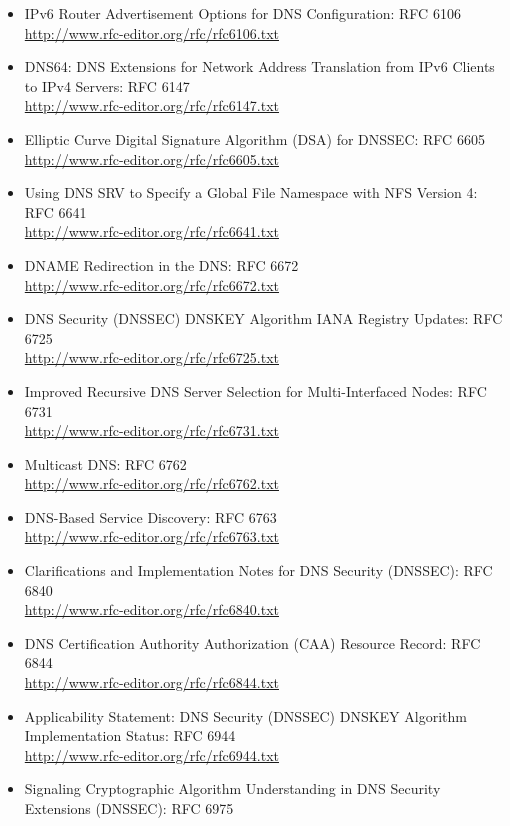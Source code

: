\begin{itemize}
\begin{itemize}
\begin{itemize}
\item IPv6 Router Advertisement Options for DNS Configuration: RFC 6106\\
\url{http://www.rfc-editor.org/rfc/rfc6106.txt}
\item DNS64: DNS Extensions for Network Address Translation from IPv6 
Clients to IPv4 Servers: RFC 6147\\
\url{http://www.rfc-editor.org/rfc/rfc6147.txt}
\item Elliptic Curve Digital Signature Algorithm (DSA) for DNSSEC: 
RFC 6605\\
\url{http://www.rfc-editor.org/rfc/rfc6605.txt}
\item Using DNS SRV to Specify a Global File Namespace with NFS 
Version 4: RFC 6641\\
\url{http://www.rfc-editor.org/rfc/rfc6641.txt}
\item DNAME Redirection in the DNS: RFC 6672\\
\url{http://www.rfc-editor.org/rfc/rfc6672.txt}
\item DNS Security (DNSSEC) DNSKEY Algorithm IANA Registry Updates: 
RFC 6725\\
\url{http://www.rfc-editor.org/rfc/rfc6725.txt}
\item Improved Recursive DNS Server Selection for Multi-Interfaced Nodes: 
RFC 6731\\
\url{http://www.rfc-editor.org/rfc/rfc6731.txt}
\item Multicast DNS: RFC 6762\\
\url{http://www.rfc-editor.org/rfc/rfc6762.txt}
\item DNS-Based Service Discovery: RFC 6763\\
\url{http://www.rfc-editor.org/rfc/rfc6763.txt}
\item Clarifications and Implementation Notes for DNS Security (DNSSEC): 
RFC 6840\\
\url{http://www.rfc-editor.org/rfc/rfc6840.txt}
\item DNS Certification Authority Authorization (CAA) Resource Record: 
RFC 6844\\
\url{http://www.rfc-editor.org/rfc/rfc6844.txt}
\item Applicability Statement: DNS Security (DNSSEC) DNSKEY Algorithm 
Implementation Status: RFC 6944\\
\url{http://www.rfc-editor.org/rfc/rfc6944.txt}
\item Signaling Cryptographic Algorithm Understanding in DNS Security 
Extensions (DNSSEC): RFC 6975\\

\end{itemize}
\end{itemize}
\end{itemize}
